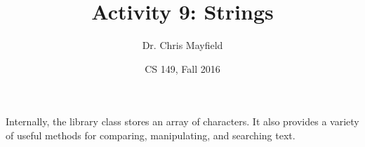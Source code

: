 \documentclass[12pt]{article}
\title{Activity 9: Strings}
\author{Dr. Chris Mayfield}
\date{CS 149, Fall 2016}
\begin{document}
\maketitle

Internally, the library class  stores an array of characters.
It also provides a variety of useful methods for comparing, manipulating, and searching text.




\end{document}
